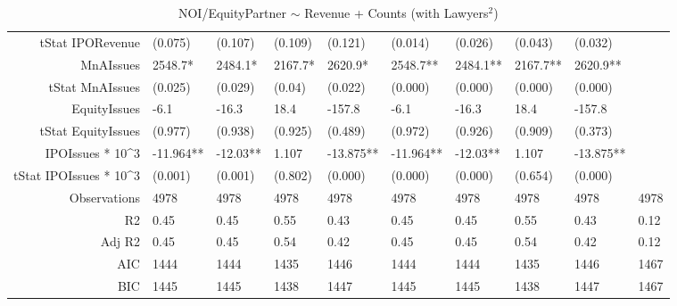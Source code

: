 \begin{table}[ht]
\begin{tabular}{rlllllllll}
  tStat IPORevenue & (0.075) & (0.107) & (0.109) & (0.121) & (0.014) & (0.026) & (0.043) & (0.032) &  \\ 
  MnAIssues & 2548.7* & 2484.1* & 2167.7* & 2620.9* & 2548.7** & 2484.1** & 2167.7** & 2620.9** &  \\ 
  tStat MnAIssues & (0.025) & (0.029) & (0.04) & (0.022) & (0.000) & (0.000) & (0.000) & (0.000) &  \\ 
  EquityIssues & -6.1 & -16.3 & 18.4 & -157.8 & -6.1 & -16.3 & 18.4 & -157.8 &  \\ 
  tStat EquityIssues & (0.977) & (0.938) & (0.925) & (0.489) & (0.972) & (0.926) & (0.909) & (0.373) &  \\ 
  IPOIssues * 10^3 & -11.964** & -12.03** & 1.107 & -13.875** & -11.964** & -12.03** & 1.107 & -13.875** &  \\ 
  tStat IPOIssues * 10^3 & (0.001) & (0.001) & (0.802) & (0.000) & (0.000) & (0.000) & (0.654) & (0.000) &  \\ 
  Observations & 4978 & 4978 & 4978 & 4978 & 4978 & 4978 & 4978 & 4978 & 4978 \\ 
  R2 & 0.45 & 0.45 & 0.55 & 0.43 & 0.45 & 0.45 & 0.55 & 0.43 & 0.12 \\ 
  Adj R2 & 0.45 & 0.45 & 0.54 & 0.42 & 0.45 & 0.45 & 0.54 & 0.42 & 0.12 \\ 
  AIC & 1444 & 1444 & 1435 & 1446 & 1444 & 1444 & 1435 & 1446 & 1467 \\ 
  BIC & 1445 & 1445 & 1438 & 1447 & 1445 & 1445 & 1438 & 1447 & 1467 \\ 
   \hline
\end{tabular}
\caption{NOI/EquityPartner $\sim$ Revenue + Counts (with Lawyers$^2$)} 
\end{table}
